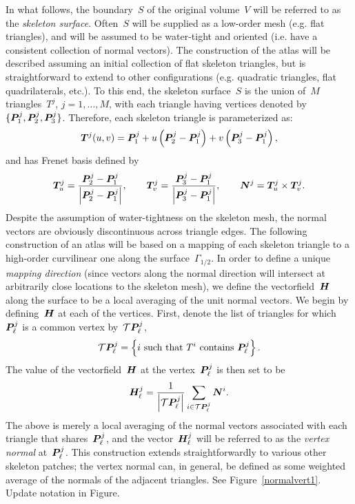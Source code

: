 \documentclass[11pt]{article}
\newcommand{\vct}{\vectorsym}
\newcommand{\lp}{\left(}
\newcommand{\rp}{\right)}
\newcommand{\cT}{\mathcal T}
\begin{document}
In what follows, the boundary~$S$ of the original volume~$V$ will be
referred to as the \emph{skeleton surface}. Often~$S$ will be supplied
as a low-order mesh (e.g. flat triangles), and will be assumed to be
water-tight and oriented (i.e. have a consistent collection of normal
vectors). The construction of the atlas will be described assuming an
initial collection of flat skeleton triangles, but is straightforward
to extend to other configurations (e.g. quadratic triangles, flat
quadrilaterals, etc.). To this end, the skeleton surface~$S$ is the
union of~$M$ triangles~$T^j$, $j=1,\ldots,M$, with each triangle
having vertices denoted
by~$\{ \vct{P}^j_1,\vct{P}^j_2,\vct{P}^j_3 \} $.
Therefore, each skeleton triangle is parameterized as:
\begin{equation}
  \vct{T}^j(u,v) = \vct{P}^j_1 + u \lp \vct{P}^j_2 - \vct{P}^j_1 \rp
  + v \lp \vct{P}^j_3 - \vct{P}^j_1 \rp,
\end{equation}
and has Frenet basis defined by
\begin{equation}
\vct{T}^j_u = \frac{\vct{P}^j_2 - \vct{P}^j_1}{\left| \vct{P}^j_2 -
    \vct{P}^j_1 \right|}, \qquad
\vct{T}^j_v = \frac{\vct{P}^j_3 - \vct{P}^j_1}{\left| \vct{P}^j_3 -
    \vct{P}^j_1 \right|}, \qquad
\vct{N}^j =  \vct{T}^j_u \times \vct{T}^j_v.
\end{equation}
Despite the assumption of water-tightness on the skeleton mesh, the
normal vectors are obviously discontinuous across triangle edges. The
following construction of an atlas will be based on a mapping of each
skeleton triangle to a high-order curvilinear one along the
surface~$\Gamma_{1/2}$. In order to define a unique \emph{mapping
  direction} (since vectors along the normal direction will intersect
at arbitrarily close locations to the skeleton mesh), we define the
vectorfield~$\vct{H}$ along the surface to be a local averaging of the
unit normal vectors. We begin by defining~$\vct{H}$ at each of the
vertices.  First, denote the list of triangles for
which~$\vct{P}^j_\ell$ is a common vertex by~$\cT \vct{P}^j_\ell$,
\begin{equation}
  \cT \vct{P}^j_\ell = \left\{ i \text{ such that } T^i \text{
      contains } \vct{P}^j_\ell \right\}.
\end{equation}
The value of the vectorfield~$\vct{H}$ at the vertex~$\vct{P}^j_\ell$
is then set to be
\begin{equation}
  \vct{H}^j_\ell = \frac{1}{
    \left|  \cT \vct{P}^j_\ell \right| } \sum_{i \in \cT
    \vct{P}^j_\ell} \vct{N}^i.
\end{equation}
The above is merely a local averaging of the normal vectors associated
with each triangle that shares~$\vct{P}^j_\ell$, and the
vector~$\vct{H}^j_\ell$ will be referred to as the \emph{vertex normal}
at~$\vct{P}^j_\ell$. This construction extends straightforwardly to
various other skeleton patches; the vertex normal can, in general, be
defined as some weighted average of the normals of the adjacent triangles.
See Figure~\ref{normalvert1}. {\color{red} Update notation in Figure.}
\end{document}

